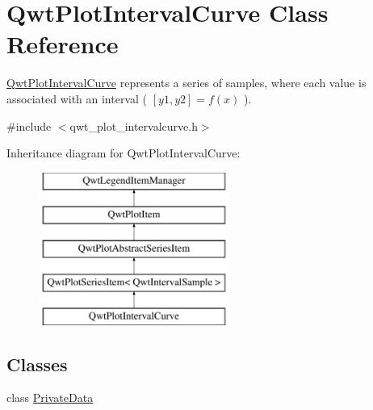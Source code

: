 \hypertarget{class_qwt_plot_interval_curve}{\section{Qwt\-Plot\-Interval\-Curve Class Reference}
\label{class_qwt_plot_interval_curve}
}


\hyperlink{class_qwt_plot_interval_curve}{Qwt\-Plot\-Interval\-Curve} represents a series of samples, where each value is associated with an interval ( $[y1,y2] = f(x)$ ).  




{\ttfamily \#include $<$qwt\-\_\-plot\-\_\-intervalcurve.\-h$>$}

Inheritance diagram for Qwt\-Plot\-Interval\-Curve\-:\begin{figure}[H]
\begin{center}
\leavevmode
\includegraphics[height=5.000000cm]{class_qwt_plot_interval_curve}
\end{center}
\end{figure}
\subsection*{Classes}
\begin{DoxyCompactItemize}
\item 
class \hyperlink{class_qwt_plot_interval_curve_1_1_private_data}{Private\-Data}
\end{DoxyCompactItemize}
